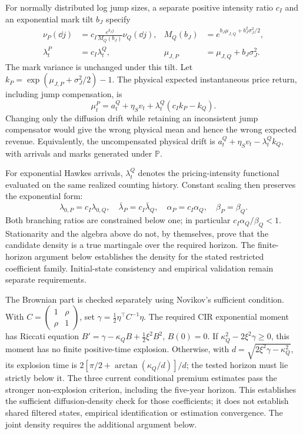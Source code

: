For normally distributed log jump sizes, a separate positive intensity
ratio $c_I$ and an exponential mark tilt $b_J$ specify
\begin{align}
\nu_P(\dd j)&=c_I\frac{e^{b_Jj}}{M_Q(b_J)}\nu_Q(\dd j),&
 M_Q(b_J)&=e^{b_J\mu_{J,Q}+b_J^2\sigma_J^2/2},\\
\lambda_t^P&=c_I\lambda_t^Q,&
\mu_{J,P}&=\mu_{J,Q}+b_J\sigma_J^2.
\label{eq:pq-jump-map}
\end{align}
The mark variance is unchanged under this tilt. Let
$k_P=\exp(\mu_{J,P}+\sigma_J^2/2)-1$. The physical expected instantaneous
price return, including jump compensation, is
\begin{equation}
\mu_t^P=a_t^Q+\eta_Sv_t+
 \lambda_t^Q(c_Ik_P-k_Q).
\label{eq:pq-total-drift}
\end{equation}
Changing only the diffusion drift while retaining an inconsistent jump
compensator would give the wrong physical mean and hence the wrong expected
revenue. Equivalently, the uncompensated physical drift is
$a_t^Q+\eta_Sv_t-\lambda_t^Qk_Q$, with arrivals and marks generated under
$\mathbb P$.

For exponential Hawkes arrivals, $\lambda_t^Q$ denotes the pricing-intensity
functional evaluated on the same realized counting history. Constant scaling
then preserves the exponential form:
\begin{equation}
\lambda_{0,P}=c_I\lambda_{0,Q},\quad
\bar\lambda_P=c_I\bar\lambda_Q,\quad
\alpha_P=c_I\alpha_Q,\quad\beta_P=\beta_Q.
\label{eq:pq-hawkes-map}
\end{equation}
Both branching ratios are constrained below one; in particular
$c_I\alpha_Q/\beta_Q<1$. Stationarity and the algebra above do not, by
themselves, prove that the candidate density is a true martingale over the
required horizon. The finite-horizon argument below establishes the density for the stated
restricted coefficient family. Initial-state consistency and empirical
validation remain separate requirements.

The Brownian part is checked separately using Novikov's sufficient condition.
With $C=\left(\begin{smallmatrix}1&\rho\\\rho&1\end{smallmatrix}\right)$,
set $\gamma=\tfrac12\eta^\top C^{-1}\eta$. The required CIR exponential
moment has Riccati equation
$B'=\gamma-\kappa_QB+\tfrac12\xi^2B^2$, $B(0)=0$.
If $\kappa_Q^2-2\xi^2\gamma\geq0$, this moment has no finite positive-time
explosion. Otherwise, with $d=\sqrt{2\xi^2\gamma-\kappa_Q^2}$, its explosion
time is $2[\pi/2+\arctan(\kappa_Q/d)]/d$; the tested horizon must lie strictly
below it. The three current conditional premium estimates pass the stronger
non-explosion criterion, including the five-year horizon. This establishes
the sufficient diffusion-density check for those coefficients; it does not
establish shared filtered states, empirical identification or estimation
convergence. The joint density requires the additional argument below.

